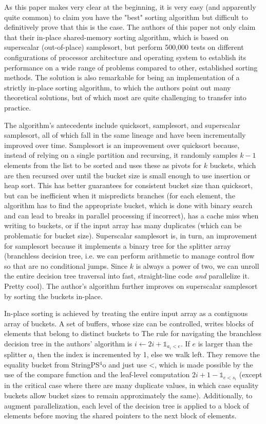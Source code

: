 As this paper makes very clear at the beginning, it is very easy (and apparently quite common) to claim you have the "best" sorting algorithm but difficult to definitively prove that this is the case. The authors of this paper not only claim that their in-place shared-memory sorting algorithm, which is based on superscalar (out-of-place) samplesort, but perform 500,000 tests on different configurations of processor architecture and operating system to establish its performance on a wide range of problems compared to other, established sorting methods. The solution is also remarkable for being an implementation of a strictly in-place sorting algorithm, to which the authors point out many theoretical solutions, but of which most are quite challenging to transfer into practice.

The algorithm's antecedents include quicksort, samplesort, and superscalar samplesort, all of which fall in the same lineage and have been incrementally improved over time. Samplesort is an improvement over quicksort because, instead of relying on a single partition and recursing, it randomly samples $k-1$ elements from the list to be sorted and uses these as pivots for $k$ buckets, which are then recursed over until the bucket size is small enough to use insertion or heap sort. This has better guarantees for consistent bucket size than quicksort, but can be inefficient when it mispredicts branches (for each element, the algorithm has to find the appropriate bucket, which is done with binary search and can lead to breaks in parallel processing if incorrect), has a cache miss when writing to buckets, or if the input array has many duplicates (which can be problematic for bucket size). Superscalar samplesort is, in turn, an improvement for samplesort because it implements a binary tree for the splitter array (branchless decision tree, i.e. we can perform arithmetic to manage control flow so that are no conditional jumps. Since $k$ is always a power of two, we can unroll the entire decision tree traversal into fast, straight-line code \textit{and} parallelize it. Pretty cool). The author's algorithm further improves on superscalar samplesort by sorting the buckets in-place. 

In-place sorting is achieved by treating the entire input array as a contiguous array of buckets. A set of buffers, whose size can be controlled, writes blocks of elements that belong to distinct buckets to  The rule for navigating the branchless decision tree in the authors' algorithm is $i \leftarrow 2i + \mathbb{1}_{a_i < e}$. If $e$ is larger than the splitter $a_i$ then the index is incremented by 1, else we walk left. They remove the equality bucket from StringPS$^4$o and just use <, which is made possible by the use of the compare function and the leaf-level computation $2i + 1 - \mathbb{1}_{e < s_i}$ (except in the critical case where there are many duplicate values, in which case equality buckets allow bucket sizes to remain approximately the same). Additionally, to augment parallelization, each level of the decision tree is applied to a block of elements before moving the shared pointers to the next block of elements. 

